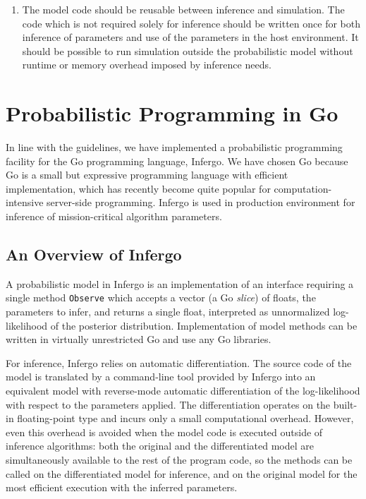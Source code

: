 \documentclass[sigplan,review,10pt,anonymous]{acmart}
\begin{document}
\begin{sloppypar}
\begin{enumerate}
\item The model code should be reusable between inference and
simulation. The code which is not required solely for inference
should be written once for both inference of parameters and use
of the parameters in the host environment.  It should be
possible to run simulation outside the probabilistic model without
runtime or memory overhead imposed by inference needs.
\end{enumerate}

\section{Probabilistic Programming in Go}

In line with the guidelines, we have implemented a probabilistic
programming facility for the Go programming language, Infergo.
We have chosen Go because Go is a
small but expressive programming language with efficient
implementation, which has recently become quite popular for
computation-intensive server-side programming. Infergo is used
in production environment for inference of mission-critical
algorithm parameters.

\subsection{An Overview of Infergo}

A probabilistic model in Infergo is an implementation of an
interface requiring a single method \lstinline{Observe} which
accepts a vector (a Go \textit{slice}) of floats, the parameters
to infer, and returns a single float, interpreted as
unnormalized log-likelihood of the posterior distribution.
Implementation of model methods can be written in virtually
unrestricted Go and use any Go libraries.

For inference, Infergo relies on automatic differentiation. The
source code of the model is translated by a command-line tool
provided by Infergo into an equivalent model with reverse-mode
automatic differentiation of the log-likelihood with respect to
the parameters applied. The differentiation operates on the
built-in floating-point type and incurs only a small
computational overhead. However, even this overhead is avoided
when the model code is executed outside of inference algorithms:
both the original and the differentiated model are
simultaneously available to the rest of the program code, so the
methods can be called on the differentiated model for inference,
and on the original model for the most efficient execution with
the inferred parameters.


\end{sloppypar}
\end{document}
